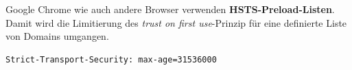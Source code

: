 Google Chrome wie auch andere Browser verwenden \textbf{HSTS-Preload-Listen}. Damit wird die Limitierung des \textit{trust on first use}-Prinzip für eine definierte Liste von Domains umgangen.

\begin{lstlisting}[language=clean,caption=HSTS-Header]
Strict-Transport-Security: max-age=31536000
\end{lstlisting}


